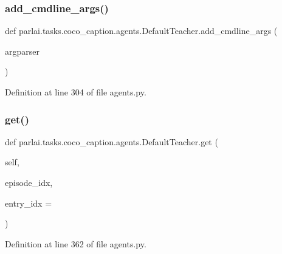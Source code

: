 \subsubsection{\texorpdfstring{add\+\_\+cmdline\+\_\+args()}{add\_cmdline\_args()}}
{\footnotesize\ttfamily def parlai.\+tasks.\+coco\+\_\+caption.\+agents.\+Default\+Teacher.\+add\+\_\+cmdline\+\_\+args (\begin{DoxyParamCaption}\item[{}]{argparser }\end{DoxyParamCaption})\hspace{0.3cm}{\ttfamily [static]}}



Definition at line 304 of file agents.\+py.

\mbox{\label{classparlai_1_1tasks_1_1coco__caption_1_1agents_1_1DefaultTeacher_ac50d86244a0030b91090d7c1ef4d7c72}} 
\subsubsection{\texorpdfstring{get()}{get()}}
{\footnotesize\ttfamily def parlai.\+tasks.\+coco\+\_\+caption.\+agents.\+Default\+Teacher.\+get (\begin{DoxyParamCaption}\item[{}]{self,  }\item[{}]{episode\+\_\+idx,  }\item[{}]{entry\+\_\+idx = {} }\end{DoxyParamCaption})}



Definition at line 362 of file agents.\+py.



